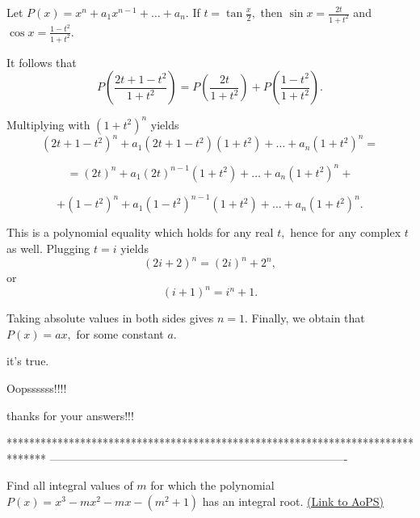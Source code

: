 \begin{solution}
	\begin{tcolorbox}Let $P\left(  x\right)  =x^{n}+a_{1}x^{n-1}+\ldots+a_{n}.$ If $t=\tan\frac
{x}{2},$ then $\sin x=\frac{2t}{1+t^{2}}$ and $\cos x=\frac{1-t^{2}}{1+t^{2}
}.$

It follows that
\[
P\left(  \frac{2t+1-t^{2}}{1+t^{2}}\right)  =P\left(  \frac{2t}{1+t^{2}
}\right)  +P\left(  \frac{1-t^{2}}{1+t^{2}}\right)  .
\]


Multiplying with $\left(  1+t^{2}\right)  ^{n}$ yields
\[
\left(  2t+1-t^{2}\right)  ^{n}+a_{1}\left(  2t+1-t^{2}\right)  \left(
1+t^{2}\right)  +\ldots+a_{n}\left(  1+t^{2}\right)  ^{n}=
\]


\[
=\left(  2t\right)  ^{n}+a_{1}\left(  2t\right)  ^{n-1}\left(  1+t^{2}\right)
+\ldots+a_{n}\left(  1+t^{2}\right)  ^{n}+
\]


\[
+\left(  1-t^{2}\right)  ^{n}+a_{1}\left(  1-t^{2}\right)  ^{n-1}\left(
1+t^{2}\right)  +\ldots+a_{n}\left(  1+t^{2}\right)  ^{n}.
\]


This is a polynomial equality which holds for any real $t,$ hence for any complex $t$ as well. Plugging $t=i$ yields
\[
\left(  2i+2\right)  ^{n}=\left(  2i\right)  ^{n}+2^{n},
\]
or
\[
\left(  i+1\right)  ^{n}=i^{n}+1.
\]


Taking absolute values in both sides gives $n=1.$ Finally, we obtain that
$P\left(  x\right)  =ax,$ for some constant $a.$\end{tcolorbox}

it's true.
\end{solution}



\begin{solution}
	Oopssssss!!!!

thanks for your answers!!!
\end{solution}
*******************************************************************************
-------------------------------------------------------------------------------

\begin{problem}
	Find all integral values of $m$ for which the polynomial $P(x)=x^3-mx^2-mx-(m^2+1)$ has an integral root.
	\flushright \href{https://artofproblemsolving.com/community/c6h392406}{(Link to AoPS)}
\end{problem}



